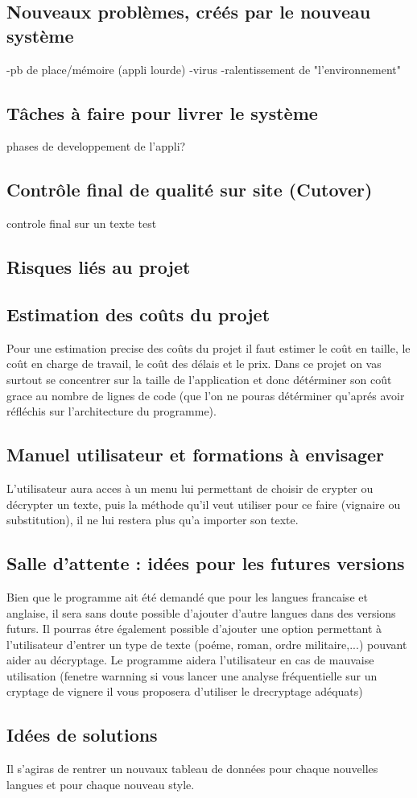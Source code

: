 \documentclass[a4]{article}
\begin{document}
		\subsection{Nouveaux problèmes, créés par le nouveau système}
		-pb de place/mémoire (appli lourde)
		-virus
		-ralentissement de "l'environnement"
		\subsection{Tâches à faire pour livrer le système}
		phases de developpement de l'appli?
		\subsection{Contrôle final de qualité sur site (Cutover)}
		controle final sur un texte test
		\subsection{Risques liés au projet}
		\subsection{Estimation des coûts du projet}
		 	Pour une estimation precise des coûts du projet il faut estimer le coût en taille, 
			le coût en charge de travail, le coût des délais et le prix. Dans ce projet on vas surtout 
			se concentrer sur la taille de l'application et donc détérminer son coût grace au nombre de 
			lignes de code (que l'on ne pouras détérminer qu'aprés avoir réfléchis sur l'architecture du 				programme).		  		
		\subsection{Manuel utilisateur et formations à envisager}
			L'utilisateur aura acces à un menu lui permettant de choisir de crypter ou décrypter un texte,
			puis la méthode qu'il veut utiliser pour ce faire (vignaire ou substitution), il ne lui restera 
			plus qu'a importer son texte.
		\subsection{Salle d’attente : idées pour les futures versions}
			Bien que le programme ait été demandé que pour les langues francaise et anglaise, 
			il sera sans doute possible d'ajouter d'autre langues dans des versions futurs. 
			Il pourras étre également possible d'ajouter une option permettant à l'utilisateur
			d'entrer un type de texte (poéme, roman, ordre militaire,...) pouvant aider au décryptage. 
			Le programme aidera l'utilisateur en cas de mauvaise utilisation (fenetre warnning si vous lancer une analyse fréquentielle sur un cryptage de vignere il vous proposera d'utiliser le drecryptage adéquats)
		\subsection{Idées de solutions}
		 	Il s'agiras de rentrer un nouvaux tableau de données pour chaque nouvelles langues et pour 
			chaque nouveau style.
\end{document}
